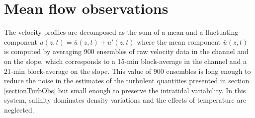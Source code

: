 
\section{Mean flow observations}

The velocity profiles are decomposed as the sum of a mean and a fluctuating component $u(z,t)=\overline{u}(z,t) + u'(z,t)$ where the mean component $\overline{u}(z,t)$ is computed by averaging 900 ensembles of raw velocity data in the channel and on the slope, which corresponds to a 15-min block-average in the channel and a 21-min block-average on the slope. This value of 900 ensembles is long enough to reduce the noise in the estimates of the turbulent quantities presented in section \ref{sectionTurbObs} but small enough to preserve the intratidal variability. In this system, salinity dominates density variations and the effects of temperature are neglected. 

